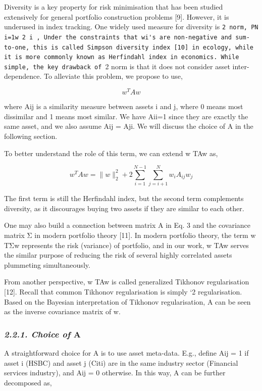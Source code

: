 \documentclass{article}
\begin{document}
Diversity is a key property for risk minimisation that has been studied extensively for general portfolio construction problems [9]. However, it is underused in index tracking. One widely used measure for diversity is \verb|2 norm, PN i=1w 2 i , Under the constraints that wi's are non-negative and sum-to-one, this is called Simpson diversity index [10] in ecology, while it is more commonly known as Herfindahl index in economics. While simple, the key drawback of |2 norm is that it does not consider asset inter-dependence. To alleviate this problem, we propose to use,

$$w^{T}Aw\tag{3}$$

where Aij is a similarity measure between assets i and j, where 0 means most dissimilar and 1 means most similar. We have Aii=1 since they are exactly the same asset, and we also assume Aij = Aji. We will discuss the choice of A in the following section.

To better understand the role of this term, we can extend w TAw as,

$$w^{T}Aw=\|w\|_{2}^{2}+2\sum_{i=1}^{N-1}\sum_{j=i+1}^{N}w_{i}A_{ij}w_{j}\tag{4}$$

The first term is still the Herfindahl index, but the second term complements diversity, as it discourages buying two assets if they are similar to each other.

One may also build a connection between matrix A in Eq. 3 and the covariance matrix Σ in modern portfolio theory [11]. In modern portfolio theory, the term w TΣw represents the risk (variance) of portfolio, and in our work, w TAw serves the similar purpose of reducing the risk of several highly correlated assets plummeting simultaneously.

From another perspective, w TAw is called generalized Tikhonov regularisation [12]. Recall that common Tikhonov regularisation is simply `2 regularisation. Based on the Bayesian interpretation of Tikhonov regularisation, A can be seen as the inverse covariance matrix of w.

\subsubsection{\textit{2.2.1. Choice of} A}

A straightforward choice for A is to use asset meta-data. E.g., define Aij = 1 if asset i (HSBC) and asset j (Citi) are in the same industry sector (Financial services industry), and Aij = 0 otherwise. In this way, A can be further decomposed as,
\end{document}
